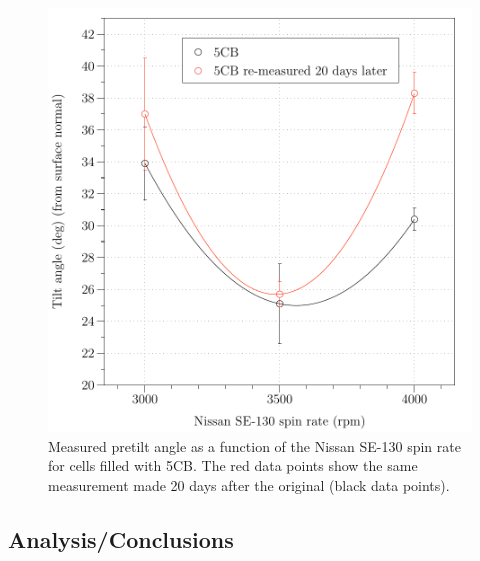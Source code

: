 \begin{figure}
\begin{center}
\includegraphics{Figures/Pretilt/double_polyimide_5cb}
\end{center}
\caption[Pretilt angle as a function of rubbing strength for 5CB]{\label{fig:double_polyimide_5cb} Measured pretilt angle as a function of the Nissan SE-130 spin rate for cells filled with 5CB. The red data points show the same measurement made 20 days after the original (black data points).}
\end{figure}

\subsection{Analysis/Conclusions}
\label{sec:pretilt_analysis}

